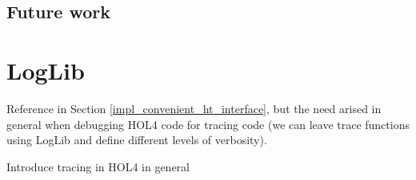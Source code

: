 \documentclass{kththesis}
\begin{document}
\section{Future work}

\printbibliography[heading=bibintoc]

\appendix

\chapter{LogLib} \label{annex_loglib}

Reference in Section \ref{impl_convenient_ht_interface}, but the need arised in general when debugging HOL4 code for tracing code (we can leave trace functions using LogLib and define different levels of verbosity).

Introduce tracing in HOL4 in general

\tailmatter %
\end{document}
